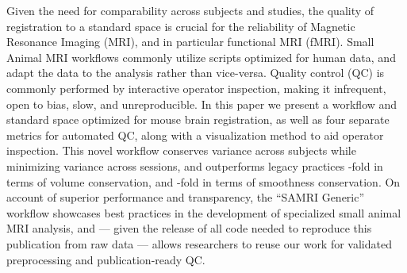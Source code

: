Given the need for comparability across subjects and studies, the quality of registration to a standard space is crucial for the reliability of Magnetic Resonance Imaging (MRI), and in particular functional MRI (fMRI).
Small Animal MRI workflows commonly utilize scripts optimized for human data, and adapt the data to the analysis rather than vice-versa.
Quality control (QC) is commonly performed by interactive operator inspection, making it infrequent, open to bias, slow, and unreproducible.
In this paper we present a workflow and standard space optimized for mouse brain registration, as well as four separate metrics for automated QC, along with a visualization method to aid operator inspection.
This novel workflow conserves variance across subjects while minimizing variance across sessions, and outperforms legacy practices
-fold in terms of volume conservation,
and -fold in terms of smoothness conservation.
On account of superior performance and transparency, the “SAMRI Generic” workflow showcases best practices in the development of specialized small animal MRI analysis, and --- given the release of all code needed to reproduce this publication from raw data --- allows researchers to reuse our work for validated preprocessing and publication-ready QC.
